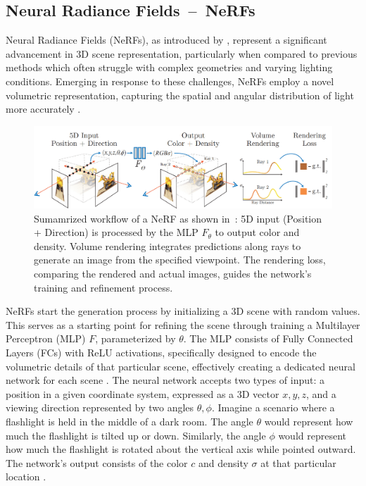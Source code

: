 \subsection{Neural Radiance Fields~--~NeRFs}\label{NeRF}

Neural Radiance Fields (NeRFs), as introduced by \citeauthor{mildenhallNERF}, represent a significant advancement in 3D scene representation, particularly when compared to previous methods which often struggle with complex geometries and varying lighting conditions. Emerging in response to these challenges, NeRFs employ a novel volumetric representation, capturing the spatial and angular distribution of light more accurately \citep{mildenhallNERF}.

\begin{figure}[ht]
    \centering
      \includegraphics[width=1\columnwidth]{figures/NeRF_Fig_2_Mildenhall.png}
      \caption{Sumamrized workflow of a NeRF as shown in~\citep{mildenhallNERF}: 5D input (Position + Direction) is processed by the MLP \(F_\theta\) to output color and density. Volume rendering integrates predictions along rays to generate an image from the specified viewpoint. The rendering loss, comparing the rendered and actual images, guides the network's training and refinement process.}\label{fig:figureNeRF}
\end{figure}

NeRFs start the generation process by initializing a 3D scene with random values. This serves as a starting point for refining the scene through training a Multilayer Perceptron (MLP) \(F\), parameterized by \(\theta\). The MLP consists of Fully Connected Layers (FCs) with ReLU activations, specifically designed to encode the volumetric details of that particular scene, effectively creating a dedicated neural network for each scene \citep{mildenhallNERF}. The neural network accepts two types of input: a position in a given coordinate system, expressed as a 3D vector \(x, y, z\), and a viewing direction represented by two angles \( \theta, \phi \). Imagine a scenario where a flashlight is held in the middle of a dark room. The angle \( \theta \) would represent how much the flashlight is tilted up or down. Similarly, the angle \( \phi \) would represent how much the flashlight is rotated about the vertical axis while pointed outward. The network's output consists of the color \(c\) and density \( \sigma \) at that particular location \citep{mildenhallNERF}. 

